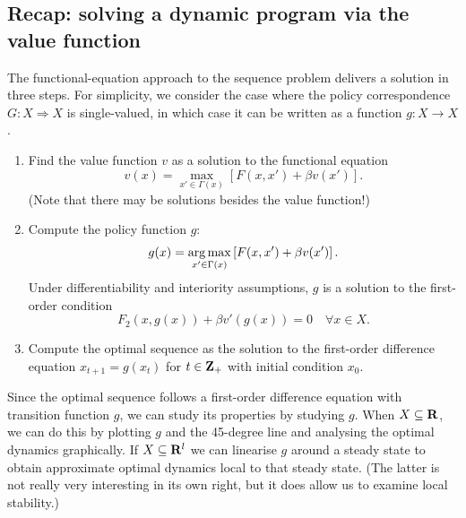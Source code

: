 \documentclass[11pt,letterpaper,reqno,oneside]{article}
\begin{document}
\subsection{Recap: solving a dynamic program via the value function}
\label{sec:28Sep2015:recap}

The functional-equation approach to the sequence problem delivers a solution in three steps. For simplicity, we consider the case where the policy correspondence $G : X \Rightarrow X$ is single-valued, in which case it can be written as a function $g : X \to X$.

\begin{enumerate}
	
	\item Find the value function $v$ as a solution to the functional equation
	\begin{equation*}
		v(x) = \max_{x' \in \Gamma(x)} \left[ F(x,x') + \beta v(x') \right] .
	\end{equation*}
	(Note that there may be solutions besides the value function!)

	\item Compute the policy function $g$:
	\begin{equation*}
		g(x) 
		= \operatorname*{arg\,max}_{x' \in \Gamma(x)} \left[ F(x,x') + \beta v(x') \right] .
	\end{equation*}
	Under differentiability and interiority assumptions, $g$ is a solution to the first-order condition
	\begin{equation*}
		F_2(x,g(x)) + \beta v'(g(x)) = 0
		\quad\forall x \in X .
	\end{equation*}

	\item Compute the optimal sequence as the solution to the first-order difference equation $x_{t+1} = g(x_t)$ for $t \in \mathbf{Z}_+$ with initial condition $x_0$.

\end{enumerate}

Since the optimal sequence follows a first-order difference equation with transition function $g$, we can study its properties by studying $g$. When $X \subseteq \mathbf{R}$, we can do this by plotting $g$ and the 45-degree line and analysing the optimal dynamics graphically. If $X \subseteq \mathbf{R}^l$ we can linearise $g$ around a steady state to obtain approximate optimal dynamics local to that steady state. (The latter is not really very interesting in its own right, but it does allow us to examine local stability.)
\end{document}
